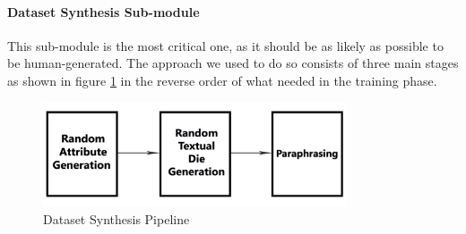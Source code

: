 \paragraph{Dataset Synthesis Sub-module}
This sub-module is the most critical one, as it should be as likely as possible to be human-generated. The approach we used to do so consists of three main stages as shown in figure \ref{fig:dataset_syn} in the reverse order of what needed in the training phase.

\begin{figure}[H]
        \centering
        \includegraphics[width=0.8\textwidth]{images/data-synthesis.png}
        \caption{Dataset Synthesis Pipeline}
        \label{fig:dataset_syn}
    \end{figure}

